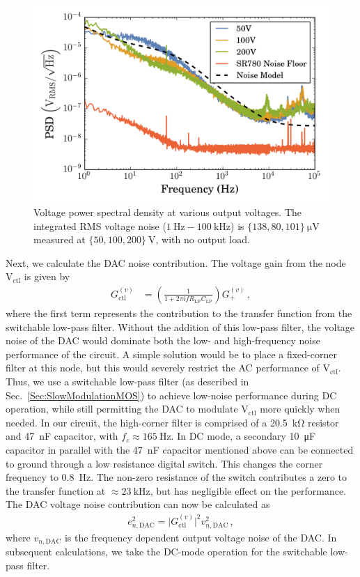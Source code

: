 \documentclass[aip,rsi,reprint]{revtex4-1} %
\begin{document}
\begin{figure}[t]
\includegraphics[width=\columnwidth]{fig/VoltagePSD.png}
\caption{Voltage power spectral density at various output voltages. The integrated RMS voltage noise ($\SI{1}{\hertz} - \SI{100}{\kilo\hertz}$) is $\{138, 80, 101\}~\si{\micro\volt}$ measured at  $\{50, 100, 200\}~\si{\volt}$, with no output load. \label{Fig:PSD}}
\end{figure}

Next, we calculate the DAC noise contribution.
The voltage gain from the node $\text{V}_{\text{ctl}}$ is given by
\begin{align}
\label{Eq:Gdc}
G^{(v)}_{\text{ctl}} &= \left(\frac{1}{1+2\pi i f R_\text{LP} C_\text{LP}}\right)G_{+}^{(v)}\,,
\end{align}
where the first term represents the contribution to the transfer function from the switchable low-pass filter.
Without the addition of this low-pass filter, the voltage noise of the DAC would dominate both the low- and high-frequency noise performance of the circuit.
A simple solution would be to place a fixed-corner filter at this node, but this would severely restrict the AC performance of $\text{V}_\text{ctl}$.
Thus, we use a switchable low-pass filter (as described in Sec.~\ref{Sec:SlowModulationMOS}) to achieve low-noise performance during DC operation, while still permitting the DAC to modulate $\text{V}_\text{ctl}$ more quickly when needed.
In our circuit, the high-corner filter is comprised of a \SI{20.5}{\kilo\ohm} resistor and \SI{47}{\nano\farad} capacitor, with $f_c \approx \SI{165}{\hertz}$.
In DC mode, a secondary \SI{10}{\micro\farad} capacitor in parallel with the \SI{47}{\nano\farad} capacitor mentioned above can be connected to ground through a low resistance digital switch.
This changes the corner frequency to \SI{0.8}{\hertz}.
The non-zero resistance of the switch contributes a zero to the transfer function at $\approx\SI{23}{\kilo\hertz}$, but has negligible effect on the performance.
The DAC voltage noise contribution can now be calculated as 
\begin{align}
e^2_{n,\text{DAC}} = \big|G^{(v)}_{\text{ctl}}\big|^2 v^2_{n,\text{DAC}}\,,
\end{align}
where $v_{n,\text{DAC}}$ is the frequency dependent output voltage noise of the DAC\cite{AD56XXRDatasheet}. 
In subsequent calculations, we take the DC-mode operation for the switchable low-pass filter.
\end{document}
